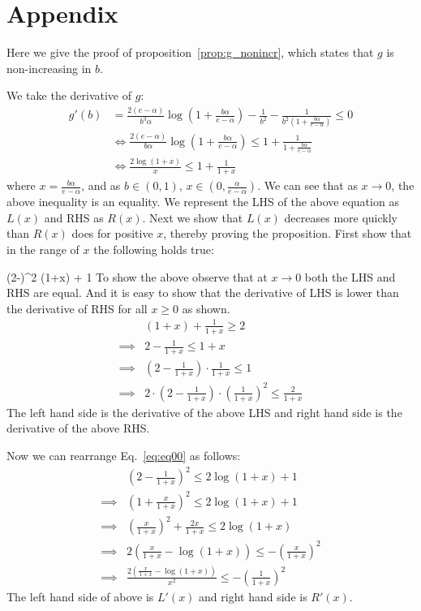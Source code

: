 \newpage
\section{Appendix}
Here we give the proof of proposition~\ref{prop:g_nonincr}, which states that $g$ is non-increasing in $b$.

\proof
We take the derivative of $g$:
\begin{align*}
g'(b) &= \frac{2(e-\alpha)}{b^3 \alpha} \log\left(1+\frac{b\alpha}{e-\alpha} \right) - \frac{1}{b^2}-\frac{1}{b^2\left(1+\frac{b\alpha}{e-\alpha}\right)} \leq 0 \\
&\iff \frac{2(e-\alpha)}{b \alpha} \log\left(1+\frac{b\alpha}{e-\alpha} \right) \leq 1+\frac{1}{1+\frac{b\alpha}{e-\alpha}} \\
&\iff \frac{2\log(1+x)}{x} \leq 1+\frac{1}{1+x}
\end{align*}
where $x = \frac{b\alpha}{e-\alpha}$, and as $b \in (0,1)$, $x \in (0, \frac{\alpha}{e-\alpha})$. We can see that as $x \rightarrow 0$, the above inequality is an equality. 
We represent the LHS of the above equation as $L(x)$ and RHS as $R(x)$. Next we show that $L(x)$ decreases more quickly than $R(x)$ does for positive $x$, thereby proving the proposition.
First show that in the range of $x$ the following holds true:

\beq
\label{eq:eq00}
\left(2-\right)^2 \log(1+x) + 1
\eeq
To show the above observe that at $x\rightarrow 0$ both the LHS and RHS are equal. And it is easy to show that the derivative of LHS is lower than the derivative of RHS for all $x\ge 0$ as shown.
\begin{align*}
& (1+x) + \frac{1}{1+x} \ge 2\\
\implies & 2 - \frac{1}{1+x} \le 1 + x\\
\implies & \left(2-\frac{1}{1+x}\right)\cdot \frac{1}{1+x} \le 1\\
\implies & 2\cdot \left(2-\frac{1}{1+x}\right)\cdot \left(\frac{1}{1+x}\right)^2 \le \frac{2}{1+x}
\end{align*}
The left hand side is the derivative of the above LHS and right hand side is the derivative of the above RHS.

Now we can rearrange Eq.~\ref{eq:eq00} as follows:
\begin{align*}
& \left(2-\frac{1}{1+x}\right)^2 \le 2\log(1+x) + 1\\
\implies & \left(1 + \frac{x}{1+x}\right)^2 \le 2\log(1+x) + 1\\
\implies & \left(\frac{x}{1+x}\right)^2 + \frac{2x}{1+x} \le 2\log(1+x)\\
\implies & 2\left(\frac{x}{1+x} - \log(1+x)\right) \le - \left(\frac{x}{1+x}\right)^2\\
\implies & \frac{2\left(\frac{x}{1+x} - \log(1+x)\right)}{x^2} \le - \left(\frac{1}{1+x}\right)^2
\end{align*}
The left hand side of above is $L'(x)$ and right hand side is $R'(x)$.

\endproof